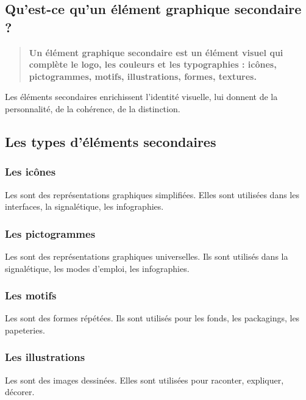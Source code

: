 \subsection{Qu'est-ce qu'un élément graphique secondaire ?}

\begin{quote}
\textbf{Un élément graphique secondaire est un élément visuel qui complète le logo, les couleurs et les typographies : icônes, pictogrammes, motifs, illustrations, formes, textures.}
\end{quote}

Les éléments secondaires enrichissent l'identité visuelle, lui donnent de la personnalité, de la cohérence, de la distinction.

\subsection{Les types d'éléments secondaires}

\subsubsection{Les icônes}

Les  sont des représentations graphiques simplifiées. Elles sont utilisées dans les interfaces, la signalétique, les infographies.

\subsubsection{Les pictogrammes}

Les  sont des représentations graphiques universelles. Ils sont utilisés dans la signalétique, les modes d'emploi, les infographies.

\subsubsection{Les motifs}

Les  sont des formes répétées. Ils sont utilisés pour les fonds, les packagings, les papeteries.

\subsubsection{Les illustrations}

Les  sont des images dessinées. Elles sont utilisées pour raconter, expliquer, décorer.


